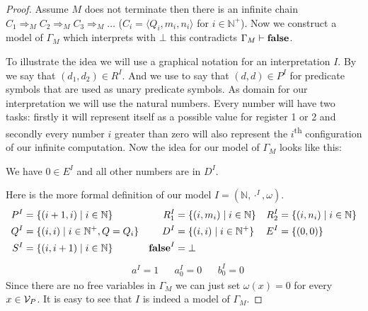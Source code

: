 \begin{proof}
	Assume $M$ does not terminate then there is an infinite chain $C_1\Rightarrow_M C_2\Rightarrow_M C_3\Rightarrow_M\dots$ ($C_i=\langle Q_i,m_i,n_i\rangle$ for $i\in\mathbb{N}^+$). Now we construct a model of $\Gamma_M$ which interprets \false{} with $\bot$ this contradicts $\Gamma_M\vdash\textbf{false}$.
	
	To illustrate the idea we will use a graphical notation for an interpretation $I$.
	By
	we say that $(d_1,d_2)\in R^I$. And we use
	to say that $(d,d)\in P^I$ for predicate symbols that are used as unary predicate symbols. 
	As domain for our interpretation we will use the natural numbers. Every number will have two tasks: firstly it will represent itself as a possible value for register 1 or 2 and secondly every number $i$ greater than zero will also represent the $i$\textsuperscript{th} configuration of our infinite computation.
	Now the idea for our model of $\Gamma_M$ looks like this:
	
	\begin{figure}[H]
		\centering
		
	\end{figure}
	We have $0\in E^I$ and all other numbers are in $D^I$.
	
	Here is the more formal definition of our model $I=(\mathbb{N},\cdot^I,\omega)$.
	\begin{align*}
		  P^I&=\{(i+1,i)\mid i\in\mathbb{N}\}              & R_1^I&=\{(i,m_i)\mid i\in\mathbb{N}\} & R_2^I&=\{(i,n_i)\mid i\in\mathbb{N}\} \\
		  Q^I&=\{(i,i)\mid i\in\mathbb{N}^+, Q=Q_i\} &  D^I&=\{(i,i)\mid i\in\mathbb{N}^+\}         & E^I&=\{(0,0)\}                            \\
		  S^I&=\{(i,i+1)\mid i\in\mathbb{N}\} & \textbf{false}^I&=\bot
	\end{align*}
	\begin{align*}
		  & a^I=1 &   & a_0^I=0 &   & b_0^I=0 
	\end{align*}
	Since there are no free variables in $\Gamma_M$ we can just set $\omega(x)=0$ for every $x\in\mathcal{V}_P$. It is easy to see that $I$ is indeed a model of $\Gamma_M$.
\end{proof}
